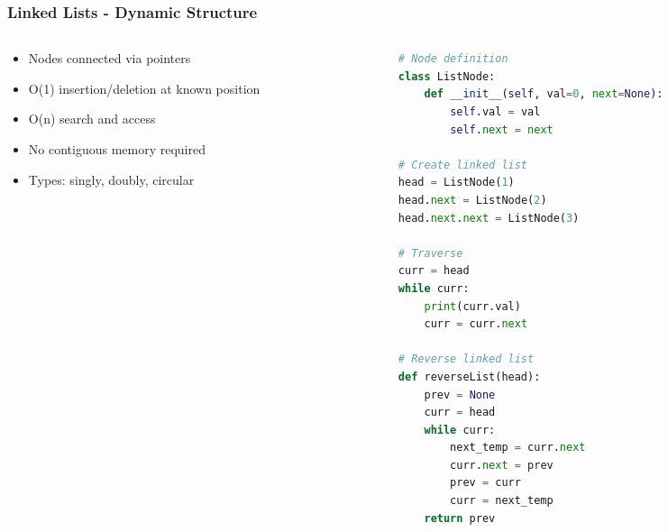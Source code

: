 \begin{frame}[fragile]\frametitle{Linked Lists - Dynamic Structure}
\begin{columns}
    \begin{column}[T]{0.6\linewidth}
      \begin{itemize}
        \item Nodes connected via pointers
        \item O(1) insertion/deletion at known position
        \item O(n) search and access
        \item No contiguous memory required
        \item Types: singly, doubly, circular
      \end{itemize}
    \end{column}
    \begin{column}[T]{0.4\linewidth}
      \begin{lstlisting}[language=python, basicstyle=\tiny]
# Node definition
class ListNode:
    def __init__(self, val=0, next=None):
        self.val = val
        self.next = next

# Create linked list
head = ListNode(1)
head.next = ListNode(2)
head.next.next = ListNode(3)

# Traverse
curr = head
while curr:
    print(curr.val)
    curr = curr.next

# Reverse linked list
def reverseList(head):
    prev = None
    curr = head
    while curr:
        next_temp = curr.next
        curr.next = prev
        prev = curr
        curr = next_temp
    return prev
      \end{lstlisting}

    \end{column}
  \end{columns}
\end{frame}

